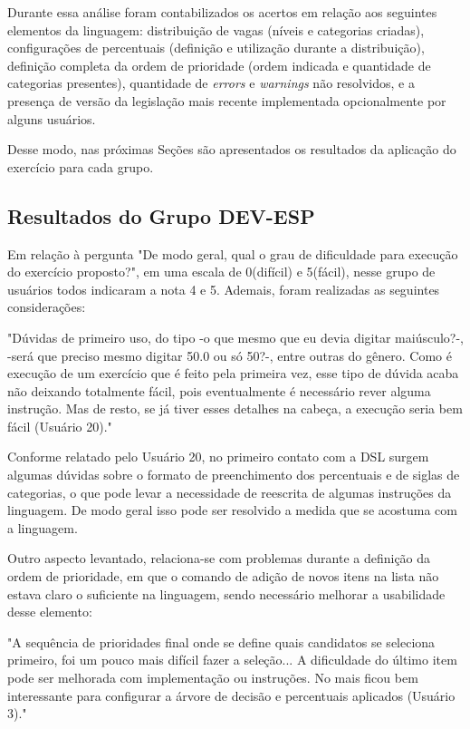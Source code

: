 Durante essa análise foram contabilizados os acertos em relação aos seguintes elementos da linguagem: distribuição de vagas (níveis e categorias criadas), configurações de percentuais (definição e utilização durante a distribuição), definição completa da ordem de prioridade (ordem indicada e quantidade de categorias presentes), quantidade de \textit{errors} e \textit{warnings} não resolvidos, e a presença de versão da legislação mais recente implementada opcionalmente por alguns usuários.

Desse modo, nas próximas Seções são apresentados os resultados da aplicação do exercício para cada grupo.

\newpage
\subsection{Resultados do Grupo DEV-ESP}
\label{subsec:devesp}

Em relação à pergunta "De modo geral, qual o grau de dificuldade para execução do exercício proposto?", em uma escala de 0(difícil) e 5(fácil), nesse grupo de usuários todos indicaram a nota 4 e 5. Ademais, foram realizadas as seguintes considerações:

 \begin{citacao}
 "Dúvidas de primeiro uso, do tipo -o que  mesmo que eu devia digitar maiúsculo?-, -será que preciso mesmo digitar 50.0 ou só 50?-,  entre outras do gênero. Como é execução de um exercício que é feito pela primeira vez, esse tipo de dúvida acaba não deixando totalmente fácil, pois eventualmente é necessário rever alguma instrução. Mas de resto, se já tiver esses detalhes na cabeça, a execução seria bem fácil (Usuário 20)."
\end{citacao}

Conforme relatado pelo Usuário 20, no primeiro contato com a DSL surgem algumas dúvidas sobre o formato de preenchimento dos percentuais e de siglas de categorias, o que pode levar a necessidade de reescrita de algumas instruções da linguagem. De modo geral isso pode ser resolvido a medida que se acostuma com a linguagem.

Outro aspecto levantado, relaciona-se com problemas durante a definição da ordem de prioridade, em que o comando de adição de novos itens na lista não estava claro o suficiente na linguagem, sendo necessário melhorar a usabilidade desse elemento:

\begin{citacao}
"A sequência de prioridades final onde se define quais candidatos se seleciona primeiro, foi um pouco mais difícil fazer a seleção... A dificuldade do último item pode ser melhorada com implementação ou instruções. No mais ficou bem interessante para configurar a árvore de decisão e percentuais aplicados (Usuário 3)." 
\end{citacao}

